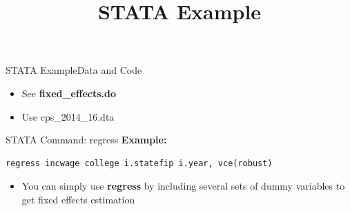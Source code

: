 \documentclass[dvipsnames,hyperref={pdfpagelabels=false}]{beamer}
\begin{document}
\title[]  
{STATA Example}


\author 
{}

\institute{}






\date
{}


\begin{frame}{}
	\titlepage
\end{frame}




\begin{frame}{STATA Example}{Data and Code}
	\begin{itemize}
		\item See \textbf{fixed\_effects.do}
		\vspace{0.2cm}
		\item Use cps\_2014\_16.dta
		
		
	\end{itemize}
\end{frame}




\begin{frame}[fragile]{STATA Command: regress}{}
	\noindent\textbf{Example:}
\begin{lstlisting}
regress incwage college i.statefip i.year, vce(robust)
\end{lstlisting}
	\begin{itemize}
		\item You can simply use \textbf{regress} by including several sets of dummy variables to get fixed effects estimation
		
	\end{itemize}
	
	
\end{frame}
\end{document}
